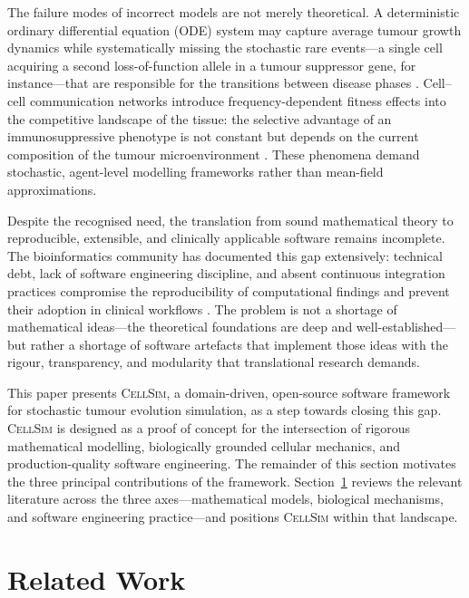 \documentclass[12pt,a4paper]{article}
\begin{document}
The failure modes of incorrect models are not merely theoretical.
A deterministic ordinary differential equation (ODE) system may capture average
tumour growth dynamics while systematically missing the stochastic rare events---a
single cell acquiring a second loss-of-function allele in a tumour suppressor gene,
for instance---that are responsible for the transitions between disease phases
\cite{gillespie1977, moran1958}.
Cell–cell communication networks introduce frequency-dependent fitness effects
into the competitive landscape of the tissue: the selective advantage of an
immunosuppressive phenotype is not constant but depends on the current
composition of the tumour microenvironment \cite{su2024, nowak2004}.
These phenomena demand stochastic, agent-level modelling frameworks rather than
mean-field approximations.

Despite the recognised need, the translation from sound mathematical theory to
reproducible, extensible, and clinically applicable software remains incomplete.
The bioinformatics community has documented this gap extensively: technical debt,
lack of software engineering discipline, and absent continuous integration practices
compromise the reproducibility of computational findings and prevent their adoption
in clinical workflows \cite{ma2024}.
The problem is not a shortage of mathematical ideas---the theoretical foundations
are deep and well-established---but rather a shortage of software artefacts that
implement those ideas with the rigour, transparency, and modularity that
translational research demands.

This paper presents \textsc{CellSim}, a domain-driven, open-source software
framework for stochastic tumour evolution simulation, as a step towards closing
this gap.
\textsc{CellSim} is designed as a proof of concept for the intersection of rigorous
mathematical modelling, biologically grounded cellular mechanics, and
production-quality software engineering.
The remainder of this section motivates the three principal contributions of the
framework.
Section~\ref{sec:related_work} reviews the relevant literature across the three
axes---mathematical models, biological mechanisms, and software engineering
practice---and positions \textsc{CellSim} within that landscape.

\section{Related Work}
\label{sec:related_work}
\end{document}
